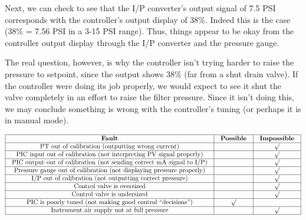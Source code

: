 Next, we can check to see that the I/P converter's output signal of 7.5 PSI corresponds with the controller's output display of 38\%.  Indeed this is the case (38\% = 7.56 PSI in a 3-15 PSI range).  Thus, things appear to be okay from the controller output display through the I/P converter and the pressure gauge.

The real question, however, is why the controller isn't trying harder to raise the pressure to setpoint, since the output shows 38\% (far from a shut drain valve).  If the controller were doing its job properly, we would expect to see it shut the valve completely in an effort to raise the filter pressure.  Since it isn't doing this, we may conclude something is wrong with the controller's tuning (or perhaps it is in manual mode).



$$\vbox{\offinterlineskip
\halign{\strut
\vrule \quad\hfil # \ \hfil & 
\vrule \quad\hfil # \ \hfil & 
\vrule \quad\hfil # \ \hfil \vrule \cr
\noalign{\hrule}
%
{\bf Fault} & {\bf Possible} & {\bf Impossible} \cr
%
\noalign{\hrule}
%
PT out of calibration (outputting wrong current) &  & $\surd$ \cr
%
\noalign{\hrule}
%
PIC input out of calibration (not interpreting PV signal properly) &  & $\surd$ \cr
%
\noalign{\hrule}
%
PIC output out of calibration (not sending correct mA signal to I/P) &  & $\surd$ \cr
%
\noalign{\hrule}
%
Pressure gauge out of calibration (not displaying pressure properly) &  & $\surd$ \cr
%
\noalign{\hrule}
%
I/P out of calibration (not outputting correct pressure) &  & $\surd$ \cr
%
\noalign{\hrule}
%
Control valve is oversized &  & $\surd$ \cr
%
\noalign{\hrule}
%
Control valve is undersized &  & $\surd$ \cr
%
\noalign{\hrule}
%
PIC is poorly tuned (not making good control ``decisions'') & $\surd$ &  \cr
%
\noalign{\hrule}
%
Instrument air supply not at full pressure &  & $\surd$ \cr
%
\noalign{\hrule}
} %
}$$ %





